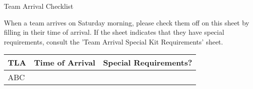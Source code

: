 \documentclass[a4paper, 12pt]{article}
\begin{document}
\begin{center}

    {\huge{Team Arrival Checklist}}

    \medskip

\end{center}

When a team arrives on Saturday morning, please check them off on this sheet by filling in their time of arrival. If the sheet indicates that they have special requirements, consult the 'Team Arrival Special Kit Requirements' sheet.

\begin{center}
\begin{table}[h]
\large
\def\arraystretch{1.5}
\begin{tabularx}{\textwidth}{|Y|Y|Y|}
    \textbf{TLA} & \textbf{Time of Arrival} & \textbf{Special Requirements?} \\
\hline
ABC & & \\ \hline
\end{tabularx}
\end{table}
\end{center}
\end{document}
